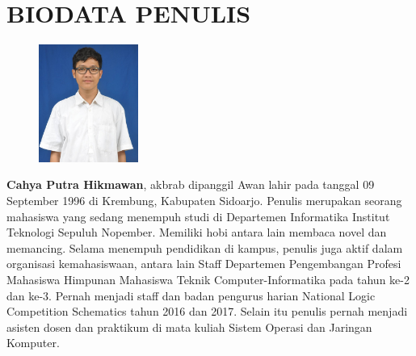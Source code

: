 \documentclass[12pt,oneside,reqno]{ta-its}
\begin{document}
	\frontmatter %
	\maketitle
	\legalityPaper %
	
    
	

	\cleardoublepage %

	\tableofcontents %
	\listoftables %
	\listoffigures %
	\lstlistoflistings %

	\mainmatter
	
	
	
	
	
	

	
	
    
    \renewcommand\chaptername{LAMPIRAN}
	\appendix
    
    

	\appendix

	\backmatter %
	\chapter{BIODATA PENULIS}
	\begin{figure}
		\includegraphics[width=0.29\textwidth]{img/CPH.jpg}
	\end{figure}
	
	\textbf{Cahya Putra Hikmawan}, akbrab dipanggil Awan lahir pada tanggal 09 September 1996 di Krembung, Kabupaten Sidoarjo. Penulis merupakan seorang mahasiswa yang sedang menempuh studi di Departemen Informatika Institut Teknologi Sepuluh Nopember. Memiliki hobi antara lain membaca novel dan memancing. Selama menempuh pendidikan di kampus, penulis juga aktif dalam organisasi kemahasiswaan, antara lain Staff Departemen Pengembangan Profesi Mahasiswa Himpunan Mahasiswa Teknik Computer-Informatika pada tahun ke-2 dan ke-3. Pernah menjadi staff dan badan pengurus harian National Logic Competition Schematics tahun 2016 dan 2017. Selain itu penulis pernah menjadi asisten dosen dan praktikum di mata kuliah Sistem Operasi dan Jaringan Komputer.
\end{document}
